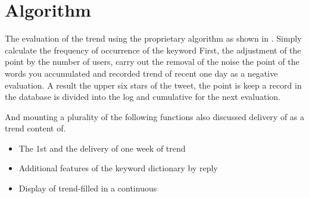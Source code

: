 \section{Algorithm}
The evaluation of the trend using the proprietary algorithm as shown in . Simply calculate the frequency of occurrence of the keyword First, the adjustment of the point by the number of users, carry out the removal of the noise the point of the words you accumulated and recorded trend of recent one day as a negative evaluation. A result the upper six stars of the tweet, the point is keep a record in the database is divided into the log and cumulative for the next evaluation.


And mounting a plurality of the following functions also discussed delivery of as a trend content of.

\begin{itemize}
    \item The 1st and the delivery of one week of trend
    \item Additional features of the keyword dictionary by reply
    \item Display of trend-filled in a continuous
\end{itemize}


